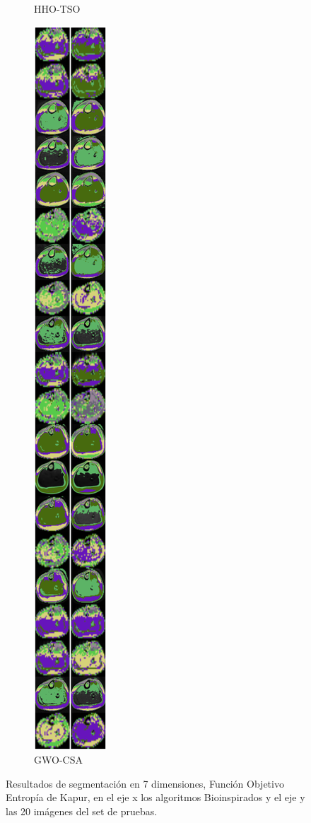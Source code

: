 \documentclass[conference]{IEEEtran}
\begin{document}
\begin{figure}[!htb]
\begin{subfigure}[b]{0.13\textwidth}
		\caption{HHO-TSO}
		\label{fig:imagen2}
	\end{subfigure}
	\begin{subfigure}[b]{0.13\textwidth}
		\includegraphics[width=\textwidth]{Umbrales/kapur/Dim7/GWO_CSA_Dim7_Kapur.png}
		\caption{GWO-CSA}
		\label{fig:imagen2}
	\end{subfigure}
	
	
	\caption{Resultados de segmentación en 7 dimensiones, Función Objetivo Entropía de Kapur, en el eje x los algoritmos Bioinspirados y el eje y las 20 imágenes del set de pruebas.}
	\label{fig:resultados7dim}
\end{figure}
\end{document}
